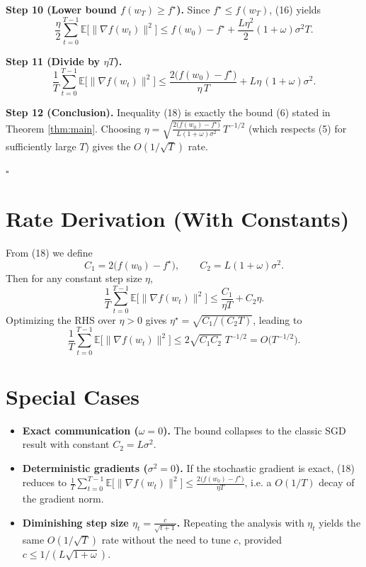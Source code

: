 \documentclass{article}
\newcommand{\E}{\mathbb{E}}
\begin{document}
\noindent\textbf{Step 10 (Lower bound $f(w_{T})\ge f^{\star}$).}
Since $f^{\star}\le f(w_{T})$, (16) yields
\[
\frac{\eta}{2}\sum_{t=0}^{T-1}\E\!\big[\|\nabla f(w_{t})\|^{2}\big]
\le f(w_{0})-f^{\star}
   +\frac{L\eta^{2}}{2}(1+\omega)\sigma^{2} T. \tag{17}
\]

\noindent\textbf{Step 11 (Divide by $\eta T$).}
\[
\frac{1}{T}\sum_{t=0}^{T-1}\E\!\big[\|\nabla f(w_{t})\|^{2}\big]
\le \frac{2\big(f(w_{0})-f^{\star}\big)}{\eta\,T}
   + L\eta\,(1+\omega)\sigma^{2}. \tag{18}
\]

\noindent\textbf{Step 12 (Conclusion).}  
Inequality (18) is exactly the bound (6) stated in Theorem
\ref{thm:main}.  Choosing $\eta = \sqrt{\frac{2\big(f(w_{0})-f^{\star}\big)}
{L(1+\omega)\sigma^{2}}}\,T^{-1/2}$ (which respects (5) for sufficiently large
$T$) gives the $O(1/\sqrt{T})$ rate.

\hfill $\square$

\section*{Rate Derivation (With Constants)}
From (18) we define
\[
C_{1}=2\big(f(w_{0})-f^{\star}\big),\qquad
C_{2}=L(1+\omega)\sigma^{2}.
\]
Then for any constant step size $\eta$,
\[
\frac{1}{T}\sum_{t=0}^{T-1}\E\!\big[\|\nabla f(w_{t})\|^{2}\big]
\le \frac{C_{1}}{\eta T}+C_{2}\eta .
\]
Optimizing the RHS over $\eta>0$ gives $\eta^{\star}= \sqrt{C_{1}/(C_{2}T)}$,
leading to
\[
\frac{1}{T}\sum_{t=0}^{T-1}\E\!\big[\|\nabla f(w_{t})\|^{2}\big]
\le 2\sqrt{C_{1}C_{2}}\;T^{-1/2}
= O\!\big(T^{-1/2}\big).
\]

\section*{Special Cases}
\begin{itemize}[leftmargin=*]
\item \textbf{Exact communication ($\omega=0$).}  
The bound collapses to the classic SGD result with constant $C_{2}=L\sigma^{2}$.
\item \textbf{Deterministic gradients ($\sigma^{2}=0$).}  
If the stochastic gradient is exact, (18) reduces to
$\frac{1}{T}\sum_{t=0}^{T-1}\E\!\big[\|\nabla f(w_{t})\|^{2}\big]
\le \frac{2\big(f(w_{0})-f^{\star}\big)}{\eta T}$,
i.e. a $O(1/T)$ decay of the gradient norm.
\item \textbf{Diminishing step size $\eta_{t}= \frac{c}{\sqrt{t+1}}$.}  
Repeating the analysis with $\eta_{t}$ yields the same $O(1/\sqrt{T})$ rate
without the need to tune $c$, provided $c\le 1/(L\sqrt{1+\omega})$.
\end{itemize}
\end{document}
